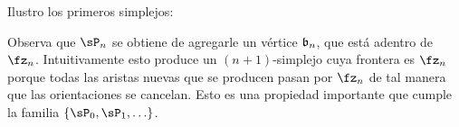 \documentclass[../../topologia_algebraica]{subfiles}
\begin{document}
Ilustro los primeros simplejos:
\begin{figure}[h!]%
  \centering
\end{figure}%

\begin{figure}[h!]%
  \centering
\end{figure}%
%
\begin{figure}[h!]%
  \centering
\end{figure}%

Observa que $\sP_n$ se obtiene de agregarle un v\'ertice $\mathfrak{b}_n$, que est\'a adentro
de $\fz_n$. Intuitivamente esto produce un $(n+1)$-simplejo cuya frontera es $\fz_n$
porque todas las aristas nuevas que se producen pasan por $\fz_n$ de tal manera que
las orientaciones se cancelan. Esto es una propiedad importante que cumple la
familia $\{\sP_0,\sP_1,\ldots\}$.
\end{document}
